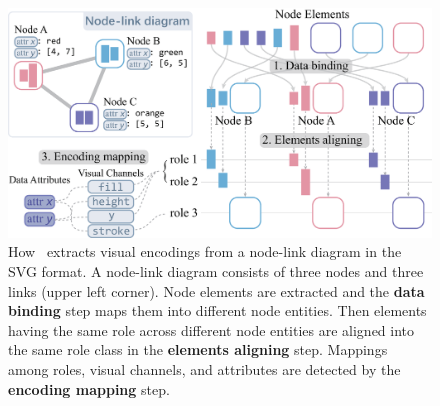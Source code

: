 \begin{figure}[ht]
    \centering
    \includegraphics[width=1\columnwidth]{figures/VisualEncodings.eps}
    \caption{How \ApproachName~extracts visual encodings from a node-link diagram in the SVG format. A node-link diagram consists of three nodes and three links (upper left corner). Node elements are extracted and the \textbf {data binding} step maps them into different node entities. Then elements having the same role across different node entities are aligned into the same role class in the \textbf{elements aligning} step. Mappings among roles, visual channels, and attributes are detected by the \textbf{encoding mapping} step.}
    \label{fig:VisualEncodings}
\end{figure}

